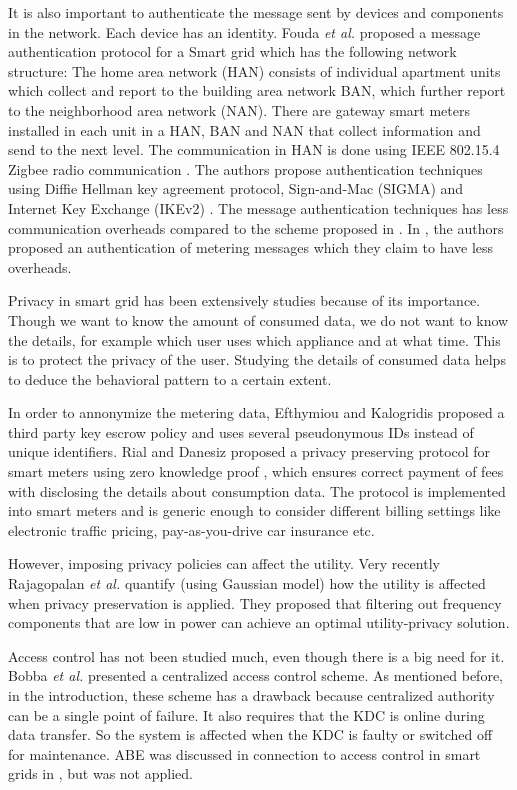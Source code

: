 \documentclass[conference]{IEEEtran}[10pt]
\begin{document}
It is also important to authenticate the message sent by devices and components in the network. 
Each device has an identity. 
Fouda \emph{et al.} \cite{FFKLS10} proposed a message authentication protocol for a Smart grid which has the following network 
structure: The home area network (HAN) consists of individual apartment units which collect and report to the building area network BAN, 
which further report to the neighborhood area network (NAN). There are gateway smart meters installed in each unit in a HAN, BAN and NAN
that collect information and send to the next level. 
The communication in HAN is done using IEEE 802.15.4 Zigbee radio communication \cite{ZIGBEE}. 
The authors propose authentication techniques using Diffie Hellman key agreement protocol, Sign-and-Mac (SIGMA) and Internet Key Exchange (IKEv2) \cite{IKE2}. 
The message authentication techniques has less communication overheads compared to the scheme proposed in \cite{KK10}. 
In \cite{CSSL11}, the authors proposed an authentication of metering messages which they claim to have less overheads. 

Privacy in smart grid has been extensively studies because of its importance. 
Though we want to know the amount of consumed data, we do not want to know the details, for example which user uses which appliance 
and at what time. 
This is to protect the privacy of the user. 
Studying the details of consumed data helps to deduce the behavioral pattern to a certain extent. 

In order to annonymize the metering data, Efthymiou and Kalogridis  \cite{EK10} proposed a third party key escrow policy and uses several pseudonymous 
IDs instead of unique identifiers. 
Rial and Danesiz \cite{RD10} proposed a privacy preserving protocol for smart meters using zero knowledge proof \cite{QQQQGGGGGGB89}, 
which ensures correct payment of fees with disclosing the details about consumption data. 
The protocol is implemented into smart meters and is generic enough to consider different billing settings like electronic traffic pricing, 
pay-as-you-drive car insurance etc.

However, imposing privacy policies can affect the utility. 
Very recently Rajagopalan \emph{et al.} \cite{RSMP11} quantify (using Gaussian model) how the utility is affected when privacy preservation is applied. 
They proposed that filtering out frequency components that are low in power can achieve an optimal utility-privacy solution. 
  
Access control has not been studied much, even though there is a big need for it. 
Bobba \emph{et al.} \cite{BKAA09} presented a  centralized access control scheme. 
As mentioned before, in the introduction,  these scheme has a drawback because centralized authority can be a single point of failure. 
It also requires that the KDC is online during data transfer. So the system is affected when the KDC is faulty or switched off for maintenance.  
ABE was discussed in connection to access control in smart grids in \cite{BKAA09}, but was not applied. 
\end{document}
